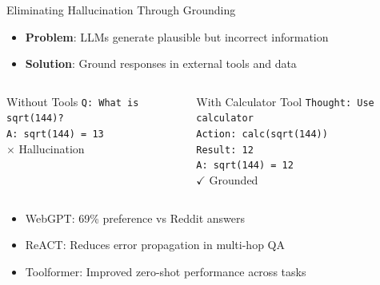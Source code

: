 \documentclass[aspectratio=169]{beamer}
\begin{document}
\begin{frame}{Eliminating Hallucination Through Grounding}
	\begin{itemize}
		\item {\color{highlight}\textbf{Problem}}: LLMs generate plausible but incorrect information
		\item {\color{highlight}\textbf{Solution}}: Ground responses in external tools and data
	\end{itemize}
	
	\begin{columns}
		\begin{block}{Without Tools}
			\small
			\texttt{Q: What is sqrt(144)?} \\
			\texttt{A: sqrt(144) = 13} \\
			{\color{red}$\times$ Hallucination}
		\end{block}
		
		\begin{block}{With Calculator Tool}
			\small
			\texttt{Thought: Use calculator} \\
			\texttt{Action: calc(sqrt(144))} \\
			\texttt{Result: 12} \\
			\texttt{A: sqrt(144) = 12} \\
			{\color{green}$\checkmark$ Grounded}
		\end{block}
	\end{columns}
	
	\vspace{0.5cm}
	\begin{itemize}
		\item WebGPT: 69\% preference vs Reddit answers
		\item ReACT: Reduces error propagation in multi-hop QA  
		\item Toolformer: Improved zero-shot performance across tasks
	\end{itemize}
	

\end{frame}
\end{document}
